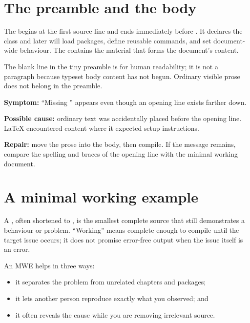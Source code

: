 \section{The preamble and the body}

The  begins at the first source line and ends immediately before
. It declares the class and later will load
packages, define reusable commands, and set document-wide behaviour. The
 contains the material that forms the document's content.


The blank line in the tiny preamble is for human readability; it is not a
paragraph because typeset body content has not begun. Ordinary visible prose
does not belong in the preamble.

\begin{commonerror}
\textbf{Symptom:} ``Missing '' appears even
though an opening line exists farther down.

\textbf{Possible cause:} ordinary text was accidentally placed before the
opening line. \LaTeX{} encountered content where it expected setup instructions.

\textbf{Repair:} move the prose into the body, then compile. If the message
remains, compare the spelling and braces of the opening line with the minimal
working document.
\end{commonerror}

\section{A minimal working example}

A , often shortened to , is the
smallest complete source that still demonstrates a behaviour or problem.
``Working'' means complete enough to compile until the target issue occurs;
it does not promise error-free output when the issue itself is an error.

An MWE helps in three ways:

\begin{itemize}
  \item it separates the problem from unrelated chapters and packages;
  \item it lets another person reproduce exactly what you observed; and
  \item it often reveals the cause while you are removing irrelevant source.
\end{itemize}

